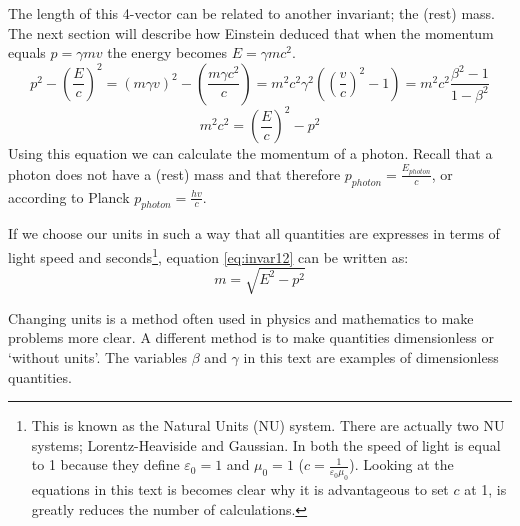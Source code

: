 \documentclass[12pt,a4paper]{article}
\numberwithin{equation}{section}
\numberwithin{figure}{section}
\numberwithin{table}{section}
\begin{document}
The length of this 4-vector can be related to another invariant; the (rest) mass. The next section will describe how Einstein deduced that when the momentum equals $p=\gamma mv$ the energy becomes $E=\gamma m c^2$. 
\begin{equation}\label{eq:invar11}
p^2-\left( \frac{E}{c}\right)^2 =(m \gamma v)^2 -\left(\frac{m \gamma c^2}{c} \right) = m^2 c^2 \gamma^2 \left( \left( \frac{v}{c}\right)^2 -1 \right) = 	m^2 c^2 \frac{\beta^2 -1 }{1-\beta^2}
\end{equation}
\begin{equation}\label{eq:invar12}
m^2 c^2 =\left( \frac{E}{c} \right)^2 - p^2
\end{equation}
Using this equation we can calculate the momentum of a photon. Recall that a photon does not have a (rest) mass and that therefore $p_{{photon}}=\frac{E_{{photon}}}{c}$, or according to Planck $p_{photon}=\frac{hv}{c}$.

If we choose our units in such a way that all quantities are expresses in terms of light speed and seconds\footnote{This is known as the Natural Units (NU) system. There are actually two NU systems; Lorentz-Heaviside and Gaussian. In both the speed of light is equal to 1 because they define $\varepsilon_0=1$ and $\mu_0=1$ ($c=\frac{1}{\varepsilon_0 \mu_0}$). Looking at the equations in this text is becomes clear why it is advantageous to set $c$ at 1, is greatly reduces the number of calculations.}, equation \ref{eq:invar12} can be written as:
\begin{equation}\label{eq:invar13}
m=\sqrt{E^2-p^2}
\end{equation}

Changing units is a method often used in physics and mathematics to make problems more clear. A different method is to make quantities dimensionless or `without units'. The variables $\beta$ and $\gamma$ in this text are examples of dimensionless quantities.
\end{document}
